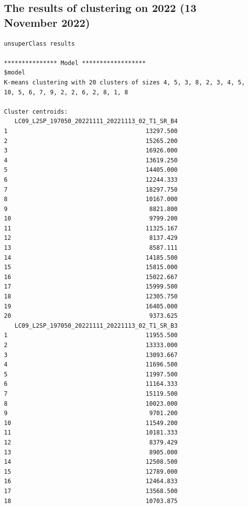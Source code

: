 \documentclass[remotesensing,article,submit,pdftex,moreauthors]{Definitions/mdpi}
\begin{document}
\subsection[\appendixname~\thesubsection]{The results of clustering on 2022 (13 November 2022)}
\begin{scriptsize}
\begin{verbatim}
unsuperClass results

*************** Model ******************
$model
K-means clustering with 20 clusters of sizes 4, 5, 3, 8, 2, 3, 4, 5, 10, 5, 6, 7, 9, 2, 2, 6, 2, 8, 1, 8

Cluster centroids:
   LC09_L2SP_197050_20221111_20221113_02_T1_SR_B4
1                                       13297.500
2                                       15265.200
3                                       16926.000
4                                       13619.250
5                                       14405.000
6                                       12244.333
7                                       18297.750
8                                       10167.000
9                                        8821.800
10                                       9799.200
11                                      11325.167
12                                       8137.429
13                                       8587.111
14                                      14185.500
15                                      15815.000
16                                      15022.667
17                                      15999.500
18                                      12305.750
19                                      16405.000
20                                       9373.625
   LC09_L2SP_197050_20221111_20221113_02_T1_SR_B3
1                                       11955.500
2                                       13333.000
3                                       13093.667
4                                       11696.500
5                                       11997.500
6                                       11164.333
7                                       15119.500
8                                       10023.000
9                                        9701.200
10                                      11549.200
11                                      10181.333
12                                       8379.429
13                                       8905.000
14                                      12508.500
15                                      12789.000
16                                      12464.833
17                                      13568.500
18                                      10703.875

\end{verbatim}
\end{scriptsize}
\end{document}
